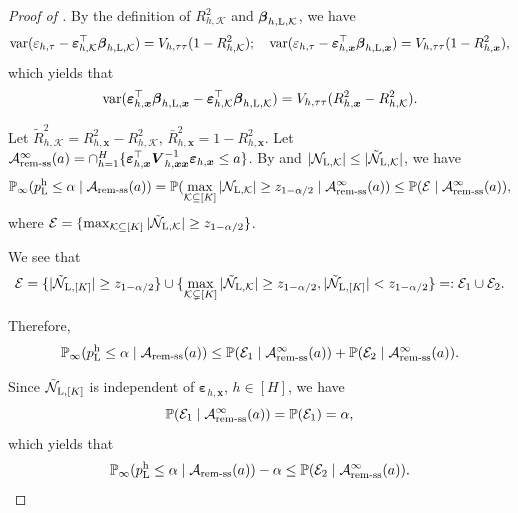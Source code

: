 \documentclass[12pt]{article}
\newcommand{\Lin}{\textnormal{L}}
\newcommand{\Prob}{\mathbb{P}}
\newcommand{\var}{\operatorname{var}}
\newcommand{\mk}{\mathcal{K}}
\newcommand{\remss}{\textnormal{rem-ss}}
\newcommand{\bs}{\boldsymbol}
\newcommand{\hpL}{p_\textnormal{L}^{\textnormal{h}}}
\begin{document}
\begin{proof}[Proof of ]
By the definition of $R^2_{h,\mk}$ and $\bs{\beta}_{ h, \Lin, \mk}$, we have
\begin{align*}
    \var(\varepsilon_{h,\tau}-\bs{\varepsilon}_{ h, \mk}^\top\bs{\beta}_{ h, \Lin, \mk}) = V_{ h,\tau\tau}(1-R^2_{ h, \mk});\quad \var(\varepsilon_{h,\tau} -  \bs{\varepsilon}_{ h, \bs{x}}^\top \bs{\beta}_{h, \Lin , \bs{x}}) = V_{ h,\tau\tau}(1 - R^2_{ h, \bs{x}}),
\end{align*}
which yields that
\begin{align*}
 \var(\bs{\varepsilon}_{ h, \bs{x}}^\top \bs{\beta}_{h, \Lin , \bs{x}}-\bs{\varepsilon}_{ h, \mk}^\top\bs{\beta}_{ h, \Lin, \mk}) =  V_{ h,\tau\tau} (R^2_{ h, \bs{x}} - R^2_{ h, \mk}).
\end{align*}

Let $\tilde{R}^2_{ h, \mk} = R^2_{ h, \bs{x}} - R^2_{ h, \mk}$, $\bar{R}_{h,\bs{x}}^2 = 1 - R_{h,\bs{x}}^2$. Let $\mathcal{A}_{\remss}^{\infty}(a) = \cap_{h=1}^H\{\bs{\varepsilon}_{h,\bs{x}}^\top\bs{V}_{h,\bs{x}\bs{x}}^{-1}\bs{\varepsilon}_{h,\bs{x}}\leq a\}$. By  and $|\mathcal{N}_{\Lin,\mk}|\leq |\tilde{\mathcal{N}}_{\Lin,\mk}|$, we have
\[
\Prob_{\infty}(\hpL \leq \alpha \mid \mathcal{A}_{\remss}(a)) = \Prob(\max_{\mk \subseteq [K]}|\mathcal{N}_{\Lin,\mk}|\geq z_{1-\alpha/2}\mid\mathcal{A}^\infty_{\remss}(a)) \leq  \Prob(\mathcal{E}\mid\mathcal{A}^\infty_{\remss}(a)),
\] 
where $\mathcal{E} = \{ \max_{\mk \subseteq [K]} |\tilde{\mathcal{N}}_{\Lin,\mk}| \geq z_{1-\alpha/2}\}$. 

We see that
\[
\mathcal{E} = \{ |\tilde{\mathcal{N}}_{\Lin,[K]}| \geq z_{1-\alpha/2}\} \cup \{ \max_{\mk \subsetneq [K]} |\tilde{\mathcal{N}}_{\Lin,\mk}| \geq z_{1-\alpha/2}, |\tilde{\mathcal{N}}_{\Lin,[K]}| < z_{1-\alpha/2}\} =: \mathcal{E}_1\cup\mathcal{E}_2.
\]

Therefore, 
\begin{align*}
\Prob_{\infty}(\hpL \leq \alpha \mid \mathcal{A}_{\remss}(a)) \leq \Prob(\mathcal{E}_1\mid\mathcal{A}_{\remss}^{\infty}(a))+\Prob(\mathcal{E}_2\mid\mathcal{A}_{\remss}^{\infty}(a)).
\end{align*}

Since $\tilde{\mathcal{N}}_{\Lin,[K]}$ is independent of $\bs{\varepsilon}_{h,\bs{x}}$, $h\in [H]$, we have
\[
\Prob(\mathcal{E}_1\mid\mathcal{A}_{\remss}^{\infty}(a)) = \Prob(\mathcal{E}_1) = \alpha,
\]
which yields that
\[
\Prob_{\infty}(\hpL \leq \alpha \mid \mathcal{A}_{\remss}(a))-\alpha \leq \Prob(\mathcal{E}_2\mid\mathcal{A}_{\remss}^{\infty}(a)).
\]


\end{proof}
\end{document}
